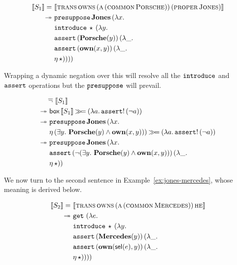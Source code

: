 \begin{align*}
  \sem{S_1} =
     &\ \sem{\appp{\abs{trans}}{\abs{owns}}{(\ap{\abs{a}}{(\ap{\abs{common}}{\abs{Porsche}})})}{(\ap{\abs{proper}}{\abs{Jones}})}} \\
\tto &\ \app{\op{presuppose}}{\obj{Jones}}{(\lam{x}{ \\
     &\ \app{\op{introduce}}{\star}{(\lam{y}{ \\
     &\ \app{\op{assert}}{(\obj{Porsche}(y))}{(\lam{\_}{ \\
     &\ \app{\op{assert}}{(\obj{own}(x, y))}{(\lam{\_}{ \\
     &\ \etaE{\star}})}})}})}})}
\end{align*}

Wrapping a dynamic negation over this will resolve all the $\mathtt{introduce}$
and $\mathtt{assert}$ operations but the $\mathtt{presuppose}$ will prevail.

\begin{align*}
&\mathop{\overline{\lnot}}\ \llbracket S_1 \rrbracket \\
\twoheadrightarrow &\ \textsf{box}\,\llbracket S_1 \rrbracket \mathbin{\gg\!=} (\lambda a.\, \mathtt{assert}!\,(\lnot a))\\
\twoheadrightarrow &\ \mathtt{presuppose}\,\textbf{Jones}\,(\lambda x.\,  \\
     &\ \eta\,(\exists y.\ \textbf{Porsche}(y) \land \textbf{own}(x, y))) \mathbin{\gg\!=} (\lambda a.\, \mathtt{assert}!\,(\lnot a)) \\
\twoheadrightarrow &\ \mathtt{presuppose}\,\textbf{Jones}\,(\lambda x.\,  \\
     &\ \mathtt{assert}\,(\lnot (\exists y.\ \textbf{Porsche}(y) \land \textbf{own}(x, y)))\,(\lambda \_.\,  \\
     &\ \eta\,\star))
\end{align*}

We now turn to the second sentence in Example~\ref{ex:jones-mercedes},
whose meaning is derived below.

\begin{align*}
  \sem{S_2} =
     &\ \sem{\appp{\abs{trans}}{\abs{owns}}{(\ap{\abs{a}}{(\ap{\abs{common}}{\abs{Mercedes}})})}{\abs{he}}} \\
\tto &\ \app{\op{get}}{}{(\lam{e}{ \\
     &\ \app{\op{introduce}}{\star}{(\lam{y}{ \\
     &\ \app{\op{assert}}{(\obj{Mercedes}(y))}{(\lam{\_}{ \\
     &\ \app{\op{assert}}{(\obj{own}(\sel(e), y))}{(\lam{\_}{ \\
     &\ \etaE{\star}})}})}})}})}
\end{align*}

